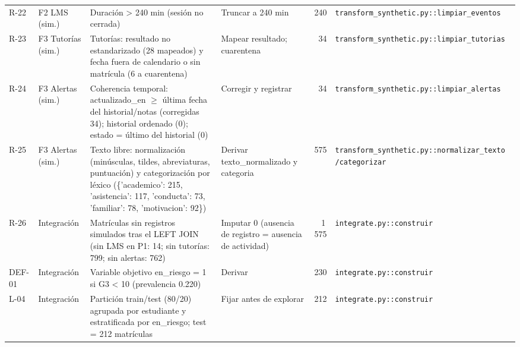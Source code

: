 \begin{tabular}{>{\raggedright\arraybackslash}p{1.0cm}>{\raggedright\arraybackslash}p{1.9cm}>{\raggedright\arraybackslash}p{8.6cm}>{\raggedright\arraybackslash}p{4.4cm}r>{\raggedright\arraybackslash}p{4.6cm}}
R-22 & F2 LMS (sim.) & Duración > 240 min (sesión no cerrada) & Truncar a 240 min & 240 & \texttt{transform\_synthetic.py::\allowbreak limpiar\_eventos} \\
R-23 & F3 Tutorías (sim.) & Tutorías: resultado no estandarizado (28 mapeados) y fecha fuera de calendario o sin matrícula (6 a cuarentena) & Mapear resultado; cuarentena & 34 & \texttt{transform\_synthetic.py::\allowbreak limpiar\_tutorias} \\
R-24 & F3 Alertas (sim.) & Coherencia temporal: actualizado\_en $\geq$ última fecha del historial/notas (corregidas 34); historial ordenado (0); estado = último del historial (0) & Corregir y registrar & 34 & \texttt{transform\_synthetic.py::\allowbreak limpiar\_alertas} \\
R-25 & F3 Alertas (sim.) & Texto libre: normalización (minúsculas, tildes, abreviaturas, puntuación) y categorización por léxico (\{'academico': 215, 'asistencia': 117, 'conducta': 73, 'familiar': 78, 'motivacion': 92\}) & Derivar texto\_normalizado y categoria & 575 & \texttt{transform\_synthetic.py::\allowbreak normalizar\_texto /\allowbreak categorizar} \\
R-26 & Integración & Matrículas sin registros simulados tras el LEFT JOIN (sin LMS en P1: 14; sin tutorías: 799; sin alertas: 762) & Imputar 0 (ausencia de registro = ausencia de actividad) & 1\,575 & \texttt{integrate.py::\allowbreak construir} \\
DEF-01 & Integración & Variable objetivo en\_riesgo = 1 si G3 < 10 (prevalencia 0.220) & Derivar & 230 & \texttt{integrate.py::\allowbreak construir} \\
L-04 & Integración & Partición train/test (80/20) agrupada por estudiante y estratificada por en\_riesgo; test = 212 matrículas & Fijar antes de explorar & 212 & \texttt{integrate.py::\allowbreak construir} \\
\bottomrule
\end{tabular}
